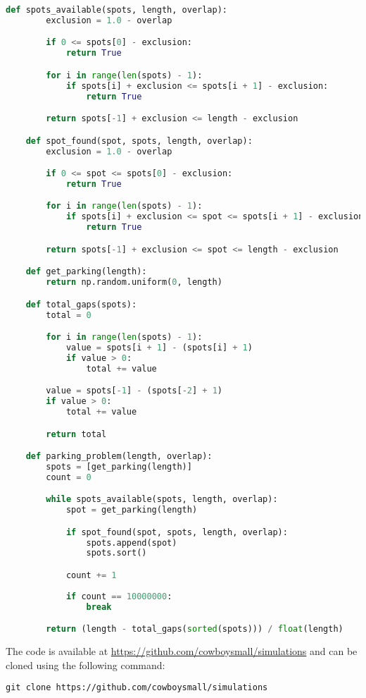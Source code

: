 \begin{lstlisting}[language=python,caption=Parking Problem - Iterative - overlap case,label=lst:code4.5]
	def spots_available(spots, length, overlap):
		exclusion = 1.0 - overlap

		if 0 <= spots[0] - exclusion:
			return True

		for i in range(len(spots) - 1):
			if spots[i] + exclusion <= spots[i + 1] - exclusion:
				return True

		return spots[-1] + exclusion <= length - exclusion

	def spot_found(spot, spots, length, overlap):
		exclusion = 1.0 - overlap

		if 0 <= spot <= spots[0] - exclusion:
			return True

		for i in range(len(spots) - 1):
			if spots[i] + exclusion <= spot <= spots[i + 1] - exclusion:
				return True

		return spots[-1] + exclusion <= spot <= length - exclusion

	def get_parking(length):
		return np.random.uniform(0, length)

	def total_gaps(spots):
		total = 0

		for i in range(len(spots) - 1):
			value = spots[i + 1] - (spots[i] + 1)
			if value > 0:
				total += value 

		value = spots[-1] - (spots[-2] + 1)
		if value > 0:
			total += value 

		return total

	def parking_problem(length, overlap):
		spots = [get_parking(length)]
		count = 0

		while spots_available(spots, length, overlap):
			spot = get_parking(length)

			if spot_found(spot, spots, length, overlap):
				spots.append(spot)
				spots.sort()

			count += 1
			
			if count == 10000000:
				break

		return (length - total_gaps(sorted(spots))) / float(length)

\end{lstlisting}  \bigskip

The code is available at \url{https://github.com/cowboysmall/simulations} 
and can be cloned using the following command: \bigskip

\begin{lstlisting}[numbers=none]
	git clone https://github.com/cowboysmall/simulations
\end{lstlisting} \bigskip

